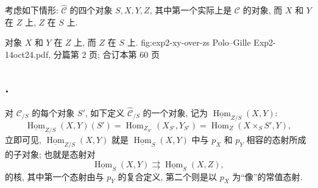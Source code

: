 考虑如下情形: \(\widehat{\mathscr C}\) 的四个对象
\(S,X,Y,Z\), 其中第一个实际上是 \(\mathscr C\) 的对象,
而 \(X\) 和 \(Y\) 在 \(Z\) 上, \(Z\) 在 \(S\) 上.

  {对象 \(X\) 和 \(Y\) 在 \(Z\) 上, 而 \(Z\) 在 \(S\) 上.}
  {fig:exp2-xy-over-zs}
  {Polo--Gille Exp2-14oct24.pdf, 分篇第 2 页; 合订本第 60 页}

\subsection*{.}
对 \(\mathscr C_{/S}\) 的每个对象 \(S'\), 如下定义
\(\widehat{\mathscr C}_{/S}\) 的一个对象, 记为
\(\underline{\operatorname{Hom}}_{Z/S}(X,Y)\):
\begin{equation}
  \underline{\operatorname{Hom}}_{Z/S}(X,Y)(S')
  =\operatorname{Hom}_{Z_{S'}}(X_{S'},Y_{S'})
  =\operatorname{Hom}_{Z}(X\times_S S',Y),
  \tag{1}\label{sga3:ii:section:1:equation:1}
\end{equation}
立即可见, \(\underline{\operatorname{Hom}}_{Z/S}(X,Y)\) 就是
\(\underline{\operatorname{Hom}}_S(X,Y)\) 中与 \(p_X\) 和 \(p_Y\)
相容的态射所成的子对象; 也就是态射对
\[
  \underline{\operatorname{Hom}}_S(X,Y)
  \rightrightarrows
  \underline{\operatorname{Hom}}_S(X,Z),
\]
的核, 其中第一个态射由与 \(p_Y\) 的复合定义,
第二个则是以 \(p_X\) 为``像''的常值态射.

